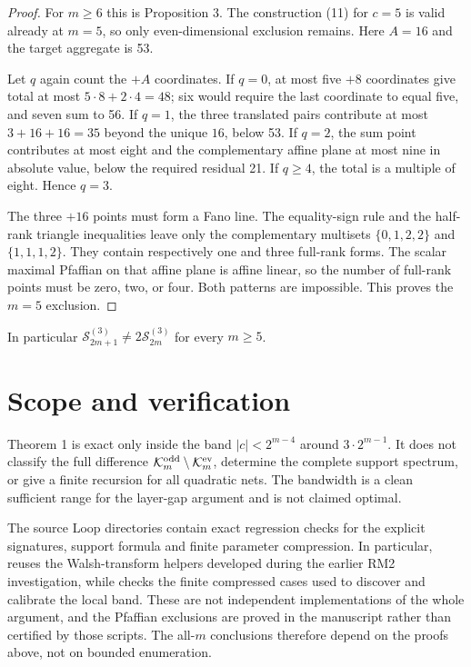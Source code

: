 \documentclass[11pt]{article}
\begin{document}
\begin{proof}


For $m\geq6$ this is Proposition 3. The construction (11) for $c=5$ is valid already at
$m=5$, so only even-dimensional exclusion remains. Here $A=16$ and the target aggregate is 53.

Let $q$ again count the $+A$ coordinates. If $q=0$, at most five $+8$ coordinates give total at
most $5\cdot8+2\cdot4=48$; six would require the last coordinate to equal five, and seven sum to
56. If $q=1$, the three translated pairs contribute at most $3+16+16=35$ beyond the unique
$16$, below 53. If $q=2$, the sum point contributes at most eight and the complementary affine
plane at most nine in absolute value, below the required residual 21. If $q\geq4$, the total is a
multiple of eight. Hence $q=3$.

The three $+16$ points must form a Fano line. The equality-sign rule and the half-rank triangle
inequalities leave only the complementary multisets $\{0,1,2,2\}$ and
$\{1,1,1,2\}$. They contain respectively one and three full-rank forms. The scalar maximal
Pfaffian on that affine plane is affine linear, so the number of full-rank points must be zero, two,
or four. Both patterns are impossible. This proves the $m=5$ exclusion.
\end{proof}


In particular $\mathcal S_{2m+1}^{(3)}\ne2\mathcal S_{2m}^{(3)}$ for every $m\geq5$.

\section{Scope and verification}


Theorem 1 is exact only inside the band $|c|<2^{m-4}$ around $3\cdot2^{m-1}$. It does not
classify the full difference $\mathcal K_m^{\rm odd}\setminus\mathcal K_m^{\rm ev}$, determine
the complete support spectrum, or give a finite recursion for all quadratic nets. The bandwidth is
a clean sufficient range for the layer-gap argument and is not claimed optimal.

The source Loop directories contain exact regression checks for the explicit signatures, support
formula and finite parameter compression. In particular,
{\small{}} reuses the Walsh-transform helpers developed during the earlier
RM2 investigation, while {\small{}} checks the finite compressed cases used
to discover and calibrate the local band. These are not independent implementations of the whole
argument, and the Pfaffian exclusions are proved in the manuscript rather than certified by those
scripts. The all-$m$ conclusions therefore depend on the proofs above, not on bounded enumeration.
\end{document}
